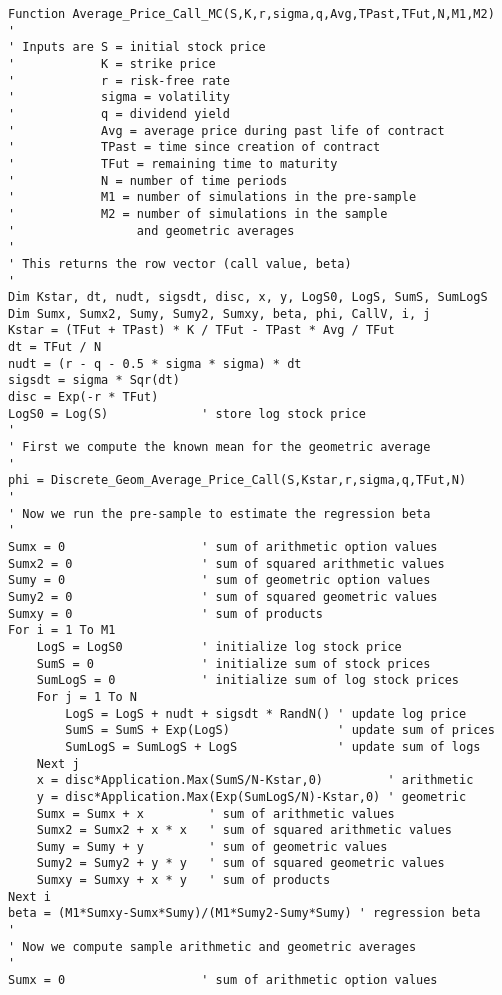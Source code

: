 \small\begin{verbatim}
Function Average_Price_Call_MC(S,K,r,sigma,q,Avg,TPast,TFut,N,M1,M2)
'
' Inputs are S = initial stock price
'            K = strike price
'            r = risk-free rate
'            sigma = volatility
'            q = dividend yield
'            Avg = average price during past life of contract
'            TPast = time since creation of contract
'            TFut = remaining time to maturity
'            N = number of time periods
'            M1 = number of simulations in the pre-sample 
'            M2 = number of simulations in the sample 
'                 and geometric averages
'
' This returns the row vector (call value, beta)
'
Dim Kstar, dt, nudt, sigsdt, disc, x, y, LogS0, LogS, SumS, SumLogS
Dim Sumx, Sumx2, Sumy, Sumy2, Sumxy, beta, phi, CallV, i, j
Kstar = (TFut + TPast) * K / TFut - TPast * Avg / TFut 
dt = TFut / N
nudt = (r - q - 0.5 * sigma * sigma) * dt
sigsdt = sigma * Sqr(dt)
disc = Exp(-r * TFut)
LogS0 = Log(S)             ' store log stock price
'
' First we compute the known mean for the geometric average
'
phi = Discrete_Geom_Average_Price_Call(S,Kstar,r,sigma,q,TFut,N)
'
' Now we run the pre-sample to estimate the regression beta
'
Sumx = 0                   ' sum of arithmetic option values
Sumx2 = 0                  ' sum of squared arithmetic values
Sumy = 0                   ' sum of geometric option values
Sumy2 = 0                  ' sum of squared geometric values
Sumxy = 0                  ' sum of products
For i = 1 To M1
    LogS = LogS0           ' initialize log stock price
    SumS = 0               ' initialize sum of stock prices
    SumLogS = 0            ' initialize sum of log stock prices
    For j = 1 To N
        LogS = LogS + nudt + sigsdt * RandN() ' update log price
        SumS = SumS + Exp(LogS)               ' update sum of prices
        SumLogS = SumLogS + LogS              ' update sum of logs
    Next j
    x = disc*Application.Max(SumS/N-Kstar,0)         ' arithmetic 
    y = disc*Application.Max(Exp(SumLogS/N)-Kstar,0) ' geometric
    Sumx = Sumx + x         ' sum of arithmetic values
    Sumx2 = Sumx2 + x * x   ' sum of squared arithmetic values
    Sumy = Sumy + y         ' sum of geometric values
    Sumy2 = Sumy2 + y * y   ' sum of squared geometric values
    Sumxy = Sumxy + x * y   ' sum of products
Next i
beta = (M1*Sumxy-Sumx*Sumy)/(M1*Sumy2-Sumy*Sumy) ' regression beta
'
' Now we compute sample arithmetic and geometric averages
'
Sumx = 0                   ' sum of arithmetic option values

\end{verbatim}
